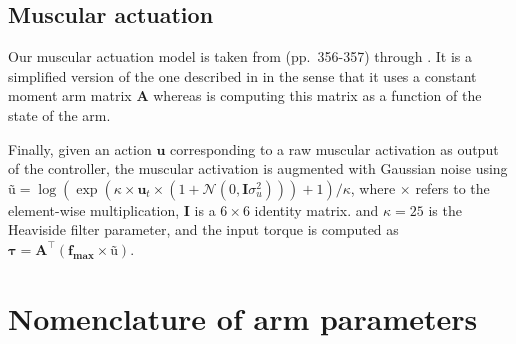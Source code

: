 \documentclass[pdftex,a4paper,11pt]{article}
\begin{document}
\subsection{Muscular actuation}
\label{sec:muscular_actuation}
Our muscular actuation model is taken from \cite{katayama93} (pp.~356-357) through \cite{mitrovic08_SAB}.
It is a simplified version of the one described in \cite{li2006} in the sense that it uses
a constant moment arm matrix $\textbf{A}$ whereas \cite{li2006} is computing this matrix as
a function of the state of the arm.

Finally, given an action $\textbf{u}$ corresponding to a raw muscular activation as output of the
controller, the muscular activation
is augmented with Gaussian noise using $\textbf{\~{u}} = \log(\exp(\kappa \times \textbf{u}_t \times (1+\mathcal{N}(0,\textbf{I}\sigma_u^2))) + 1) / \kappa$, where $\times$ refers to the element-wise multiplication, $\textbf{I}$ is a $6 \times 6$ identity matrix.
and $\kappa = 25$ is the Heaviside filter parameter, and the input torque 
is computed as $\boldsymbol{\tau} = \textbf{A}^\top ( \textbf{f}_\textbf{max} \times \textbf{\~{u}} )$.

\appendix
\section{Nomenclature of arm parameters}
\label{sec:params}
\end{document}
